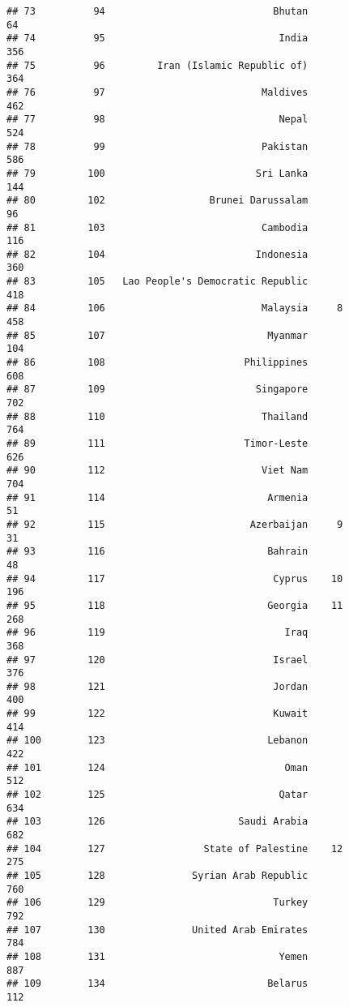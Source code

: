 \documentclass[]{article}
\begin{document}
\begin{verbatim}
## 73          94                             Bhutan                 64
## 74          95                              India                356
## 75          96         Iran (Islamic Republic of)                364
## 76          97                           Maldives                462
## 77          98                              Nepal                524
## 78          99                           Pakistan                586
## 79         100                          Sri Lanka                144
## 80         102                  Brunei Darussalam                 96
## 81         103                           Cambodia                116
## 82         104                          Indonesia                360
## 83         105   Lao People's Democratic Republic                418
## 84         106                           Malaysia     8          458
## 85         107                            Myanmar                104
## 86         108                        Philippines                608
## 87         109                          Singapore                702
## 88         110                           Thailand                764
## 89         111                        Timor-Leste                626
## 90         112                           Viet Nam                704
## 91         114                            Armenia                 51
## 92         115                         Azerbaijan     9           31
## 93         116                            Bahrain                 48
## 94         117                             Cyprus    10          196
## 95         118                            Georgia    11          268
## 96         119                               Iraq                368
## 97         120                             Israel                376
## 98         121                             Jordan                400
## 99         122                             Kuwait                414
## 100        123                            Lebanon                422
## 101        124                               Oman                512
## 102        125                              Qatar                634
## 103        126                       Saudi Arabia                682
## 104        127                 State of Palestine    12          275
## 105        128               Syrian Arab Republic                760
## 106        129                             Turkey                792
## 107        130               United Arab Emirates                784
## 108        131                              Yemen                887
## 109        134                            Belarus                112

\end{verbatim}
\end{document}
